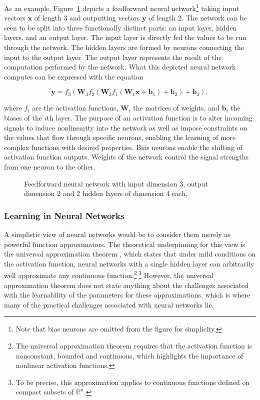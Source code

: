 As an example, Figure~\ref{fig:nn} depicts a feedforward neural network\footnote{Note that bias neurons are omitted from the figure for simplicity.} taking input vectors $\mathbf{x}$ of length $3$ and outputting vectors $\mathbf{y}$ of length $2$. The network can be seen to be split into three functionally distinct parts: an input layer, hidden layers, and an output layer. The input layer is directly fed the values to be run through the network. The hidden layers are formed by neurons connecting the input to the output layer. The output layer represents the result of the computation performed by the network. What this depicted neural network computes can be expressed with the equation

$$\mathbf{y} = f_3(\mathbf{W}_3 f_2(\mathbf{W}_2 f_1(\mathbf{W}_1 \mathbf{x} + \mathbf{b}_1) + \mathbf{b}_2) + \mathbf{b}_3),$$

where $f_i$ are the activation functions, $\mathbf{W}_i$ the matrices of weights, and $\mathbf{b}_i$ the biases of the $i$th layer. The purpose of an activation function is to alter incoming signals to induce nonlinearity into the network as well as impose constraints on the values that flow through specific neurons, enabling the learning of more complex functions with desired properties. Bias neurons enable the shifting of activation function outputs. Weights of the network control the signal strengths from one neuron to the other.

\begin{figure}[!htb]
  \centering
  \resizebox{0.8\textwidth}{!}{\unskip}
  \caption{Feedforward neural network with input dimension 3, output dimension 2 and 2 hidden layers of dimension 4 each.}
  \label{fig:nn}
\end{figure}

\subsubsection{Learning in Neural Networks}

A simplistic view of neural networks would be to consider them merely as powerful function approximators. The theoretical underpinning for this view is the universal approximation theorem \cite{universal_approximation_theorem}, which states that under mild conditions on the activation function, neural networks with a single hidden layer can arbitrarily well approximate any continuous function.\footnote{The universal approximation theorem requires that the activation function is nonconstant, bounded and continuous, which highlights the importance of nonlinear activation functions.}$^{,}$\footnote{To be precise, this approximation applies to continuous functions defined on compact subsets of $\mathbb{R}^n$.} However, the universal approximation theorem does not state anything about the challenges associated with the learnability of the parameters for these approximations, which is where many of the practical challenges associated with neural networks lie.

